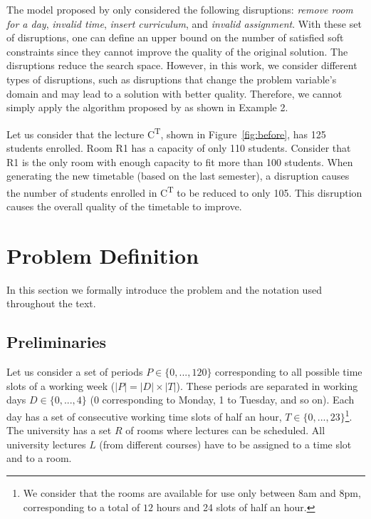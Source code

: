 \documentclass[twocolumn,natbib]{svjour3}          %
\newcounter{constraint}
\begin{document}
The model proposed by \cite{LINDAHL2019}  only considered the following disruptions: \textit{remove room for a day}, \textit{invalid time}, \textit{insert curriculum}, and \textit{invalid assignment}.
With these set of disruptions, one can define an upper bound on the number of satisfied soft constraints since they cannot improve the quality of the original solution. The disruptions reduce the search space. However, in this work, we consider different types of disruptions, such as disruptions that change the problem variable's domain and may lead to a solution with better quality. Therefore, we cannot simply apply the algorithm proposed by \cite{LINDAHL2019} as shown in Example 2.

\begin{example}
	Let us consider that the lecture C\textsuperscript{T}, shown in Figure~\ref{fig:before}, has 125 students enrolled. Room R1 has a capacity of only 110 students. Consider that R1 is the only room with enough capacity to fit more than 100 students. When generating the new timetable (based on the last semester), a disruption causes the number of students enrolled in C\textsuperscript{T} to be reduced to only 105. This disruption causes the overall quality of the timetable to improve.
\end{example}





\section{Problem Definition}\label{sec:pro}


In this section we formally introduce the problem and the notation used throughout the text.

\subsection{Preliminaries}

Let us consider a set of periods $P \in \{0,...,120\}$ corresponding to all possible time slots of a working week ($|P| = |D| \times |T|$). These periods are separated in working days $D \in \{0,...,4\}$ (0 corresponding to Monday, 1 to Tuesday, and so on). Each day has a set of consecutive working time slots of half an hour, $T \in \{0,...,23\}$\footnote{We consider that the rooms are available for use only between $8$am and $8$pm, corresponding to a total of $12$ hours and 24 slots of half an hour.}. The university has a set $R$ of rooms where lectures can be scheduled. All university lectures $L$ (from different courses) have to be assigned to a time slot and to a room. 
\end{document}
